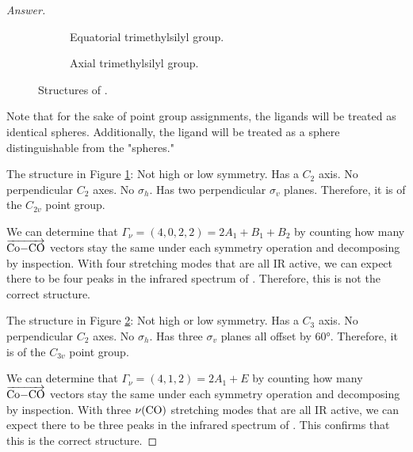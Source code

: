 \documentclass[../psets.tex]{subfiles}
\begin{document}
\begin{enumerate}[label={\Roman*)}]
    \begin{proof}[Answer]
        \begin{figure}[h!]
            \centering
            \begin{subfigure}[b]{0.35\linewidth}
                \centering
                \footnotesize
                \caption{Equatorial trimethylsilyl group.}
                \label{fig:structure-CoCO4SiMe3a}
            \end{subfigure}
            \begin{subfigure}[b]{0.35\linewidth}
                \centering
                \footnotesize
                \caption{Axial trimethylsilyl group.}
                \label{fig:structure-CoCO4SiMe3b}
            \end{subfigure}
            \caption{Structures of .}
            \label{fig:structure-CoCO4SiMe3}
        \end{figure}
        Note that for the sake of point group assignments, the  ligands will be treated as identical spheres. Additionally, the  ligand will be treated as a sphere distinguishable from the  "spheres."\par\medskip 
        The structure in Figure \ref{fig:structure-CoCO4SiMe3a}: Not high or low symmetry. Has a $C_2$ axis. No perpendicular $C_2$ axes. No $\sigma_h$. Has two perpendicular $\sigma_v$ planes. Therefore, it is of the $C_{2v}$ point group.\par
        We can determine that $\Gamma_\nu=(4,0,2,2)=2A_1+B_1+B_2$ by counting how many $\overrightarrow{\ce{Co-CO}}$ vectors stay the same under each symmetry operation and decomposing by inspection. With four stretching modes that are all IR active, we can expect there to be four peaks in the infrared spectrum of . Therefore, this is not the correct structure.\par\medskip
        The structure in Figure \ref{fig:structure-CoCO4SiMe3b}: Not high or low symmetry. Has a $C_3$ axis. No perpendicular $C_2$ axes. No $\sigma_h$. Has three $\sigma_v$ planes all offset by $\ang{60}$. Therefore, it is of the $C_{3v}$ point group.\par
        We can determine that $\Gamma_\nu=(4,1,2)=2A_1+E$ by counting how many $\overrightarrow{\ce{Co-CO}}$ vectors stay the same under each symmetry operation and decomposing by inspection. With three $\nu(\ce{CO})$ stretching modes that are all IR active, we can expect there to be three peaks in the infrared spectrum of . This confirms that this is the correct structure.

\end{proof}
\end{enumerate}
\end{document}
